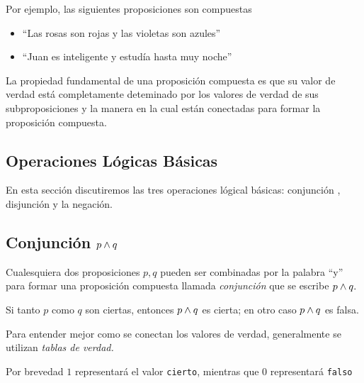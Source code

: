    Por ejemplo, las siguientes proposiciones son compuestas
    \begin{itemize}
        \item ``Las rosas son rojas y las violetas son azules''
        \item ``Juan es inteligente y estud\'ia hasta muy noche''
    \end{itemize}
    



    La propiedad fundamental de una proposici\'on compuesta es que su valor de verdad est\'a completamente deteminado por los valores de verdad de sus subproposiciones y la manera en la cual est\'an conectadas para formar la proposici\'on compuesta. 


\subsection{Operaciones L\'ogicas B\'asicas}


    En esta secci\'on discutiremos las tres operaciones l\'ogical b\'asicas: conjunci\'on , disjunci\'on  y la negaci\'on.


\subsection{Conjunci\'on $p \wedge q$}


    Cualesquiera dos proposiciones $p,q$ pueden ser combinadas por la palabra ``y'' para formar una proposici\'on compuesta llamada \emph{conjunci\'on} que se escribe $p\wedge q.$



    \begin{defn}
        Si tanto $p$ como $q$ son ciertas, entonces $p \wedge q$ es cierta; en otro caso $p\wedge q$ es falsa.
    \end{defn}
    



    \begin{rem}
        Para entender mejor como se conectan los valores de verdad, generalmente se utilizan \emph{tablas de verdad.}  
        
        Por brevedad $1$ representar\'a el valor \texttt{cierto}, mientras que $0$ representar\'a \texttt{falso}
    \end{rem}
    



